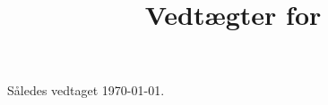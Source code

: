 \title{Vedtægter for {\@selskabsnavn}}


\maketitle



\noindent Således vedtaget \today.

\renewcommand{\arraystretch}{2}
\begin{center}
\end{center}


